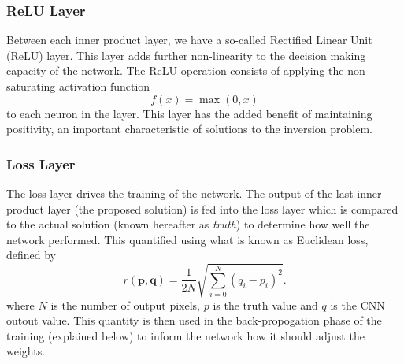 \documentclass[twoside]{article}
\begin{document}
\begin{multicols}{2}
\subsubsection{ReLU Layer}
Between each inner product layer, we have a so-called Rectified Linear Unit (ReLU) layer. This layer adds further non-linearity to the decision making capacity of the network. The ReLU operation consists of applying the non-saturating activation function
\begin{equation}
f(x) = \max(0, x)
\end{equation} to each neuron in the layer. This layer has the added benefit of maintaining positivity, an important characteristic of solutions to the inversion problem.
\subsubsection{Loss Layer}
The loss layer drives the training of the network. The output of the last inner product layer (the proposed solution) is fed into the loss layer which is compared to the actual solution (known hereafter as \textit{truth}) to determine how well the network performed. This quantified using what is known as Euclidean loss, defined by
\begin{equation}
r(\mathbf{p},\mathbf{q}) = \frac{1}{2N} \sqrt{\sum_{i=0}^{N}(q_i - p_i)^2}.
\end{equation}
where $N$ is the number of output pixels, $p$ is the truth value and $q$ is the CNN outout value. This quantity is then used in the back-propogation phase of the training (explained below) to inform the network how it should adjust the weights.

\end{multicols}
\end{document}
